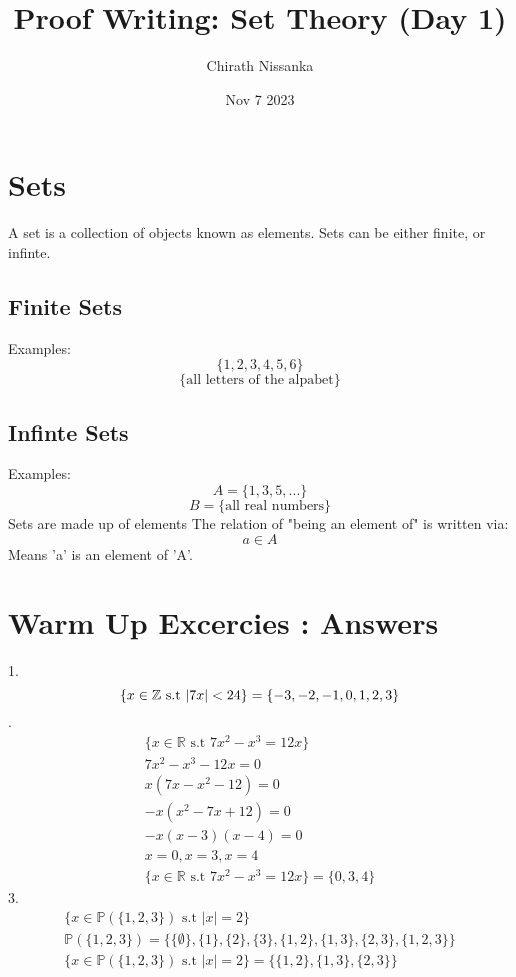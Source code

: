 \documentclass{article}
\author{Chirath Nissanka}
\title{Proof Writing: Set Theory (Day 1)}
\date{Nov 7 2023}
\begin{document}
    \maketitle
    \section{Sets}
    A set is a collection of objects known as elements.
    Sets can be either finite, or infinte.
    \subsection{Finite Sets}
    Examples:
    \[
        \{1,2,3,4,5,6\}   
    \]
    \[
        \{\text{all letters of the alpabet}\}   
    \]
    \subsection{Infinte Sets}
    Examples:
    \[
        A = \{1,3,5,...\}  
    \]
    \[
        B = \{\text{all real numbers}\}   
    \]
Sets are made up of elements 
The relation of "being an element of" is written via:
 \[ a \in A\]
 Means 'a' is an element of 'A'.
 
\section{Warm Up Excercies : Answers}
1.
\begin{dmath}
    \{ x \in \mathbb{Z} \text{ s.t } |7x| < 24 \} =  \\ 
    \{ -3, -2, -1, 0, 1, 2, 3 \} 
\end{dmath}
.
\[
    \begin{split}
        \{ x \in \mathbb{R} \text{ s.t }  7x^2 - x^3 = 12x \}  \\ 
        7x^2 - x^3 - 12x = 0 \\
        x  (7x - x^2 - 12) = 0 \\
        -x  (x^2 - 7x + 12) = 0 \\ 
        -x (x - 3) (x - 4) = 0 \\ 
        x = 0, x = 3, x = 4 \\
        \{ x \in \mathbb{R} \text{ s.t }  7x^2 - x^3 = 12x \}  = \{ 0, 3, 4\}
    \end{split}
\]
3. 
\[
    \begin{split}
        \{ x \in \mathbb{P}(\{1,2,3\}) \text{ s.t } |x| = 2 \}  \\
        \mathbb{P}(\{1,2,3\}) = \{\{\emptyset\}, \{1\}, \{2\}, \{3\}, \{1,2\}, \{1,3\}, \{2,3\}, \{1,2,3\}\}\\
        \{ x \in \mathbb{P}(\{1,2,3\}) \text{ s.t } |x| = 2 \}= \{\{1,2\},\{1,3\},\{2,3\}\}
    \end{split}
\]
\end{document}
